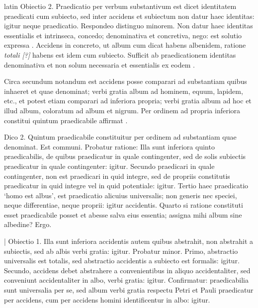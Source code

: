 \begin{otherlanguage*}{latin}
\pstart
Obiectio 2. Praedicatio per verbum substantivum est dicet identitatem praedicati cum subiecto, sed inter accidens et subiectum non datur haec identitas:
igitur neque praedicatio. Respondeo distinguo minorem. Non datur haec identitas essentialis et intrinseca, concedo; denominativa et concretiva, nego:
est solutio expressa . Accidens in concreto, ut album cum dicat habens albenidem, ratione \emph{totali [?]} habens est idem cum subiecto. Sufficit ab praedicationem identitas denominativa et non solum necessaria et essentialis ex eodem . 
\pend

\pstart
Circa secundum notandum est accidens posse comparari ad substantiam quibus inhaeret et quae denominat; verbi gratia album ad hominem, equum, lapidem, etc., et potest etiam comparari ad inferiora propria; verbi gratia album ad hoc et illud album, coloratum ad album et nigrum. Per ordinem ad propria inferiora constitui quintum praedicabile affirmat . 
\pend

\pstart
Dico 2. Quintum praedicabile constituitur per ordinem ad substantiam quae denominat. Est communi. Probatur ratione:
Illa sunt inferiora quinto praedicabilis, de quibus praedicatur in quale contingenter, sed de solis subiectis praedicatur in quale contingenter:
igitur. Secundo praedicari in quale contingenter, non est praedicari in quid integre, sed de propriis constitutis praedicatur in quid integre vel in quid potentiale:
igitur. Tertio haec praedicatio `homo est albus', est praedicatio alicuius universalis; non generis nec speciei, neque differentiae, neque proprii:
igitur accidentis. Quarto si ratione constituti esset praedicabile posset et abesse salva eius essentia; assigna mihi album sine albedine? Ergo. 
\pend

\pstart
\textnormal{|} Obiectio 1. Illa sunt inferiora accidentis autem quibus abstrahit, non abstrahit a subiectis, sed ab albis verbi gratia:
igitur. Probatur minor. Primo, abstractio universalis est totalis, sed abstractio accidentis a subiecto est formalis:
igitur. Secundo, accidens debet abstrahere a convenientibus in aliquo accidentaliter, sed conveniunt accidentaliter in albo, verbi gratia:
igitur. Confirmatur:
praedicabilia sunt universalia per se, sed album verbi gratia respectu Petri et Pauli praedicatur per accidens, cum per accidens homini identificentur in albo:
igitur. 
\pend


\end{otherlanguage*}
